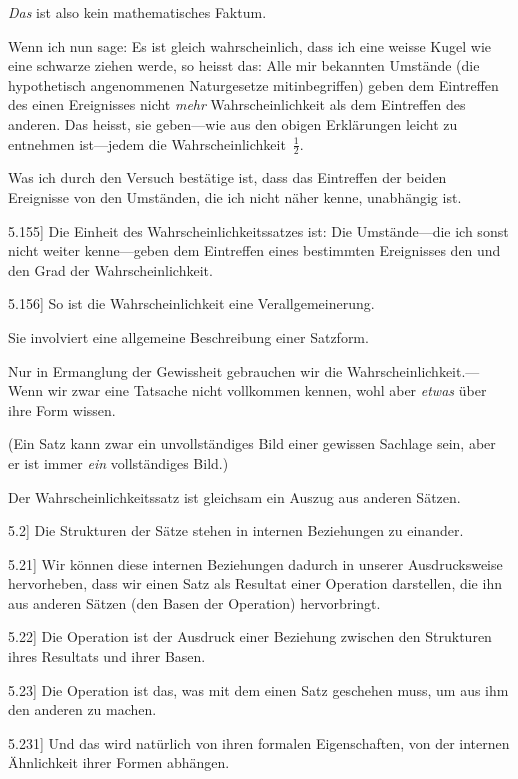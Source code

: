 \documentclass[12pt,oneside]{book}[2007/10/19]
\newcommand{\PropERef}[1]{\hyperref[PropE:#1]{#1}}
\newcommand{\PropositionG}[2]{%
  \item[\phantomsection\label{PropG:#1}\PropERef{#1}] #2%
}
\newcommand{\Emph}[1]{\emph{#1}}%
\begin{document}
\begin{propositions}
{\Emph{Das} ist also kein mathematisches Faktum.

Wenn ich nun sage: Es ist gleich wahrscheinlich,
dass ich eine weisse Kugel wie eine
schwarze ziehen werde, so heisst das: Alle mir
bekannten Umstände (die hypothetisch angenommenen
Naturgesetze mitinbegriffen) geben dem
Eintreffen des einen Ereignisses nicht \Emph{mehr}
Wahrscheinlichkeit als dem Eintreffen des anderen.
Das heisst, sie geben---wie aus den obigen Erklärungen
leicht zu entnehmen ist---jedem die
Wahrscheinlichkeit~$\frac{1}{2}$.

Was ich durch den Versuch bestätige ist, dass
das Eintreffen der beiden Ereignisse von den Umständen,
die ich nicht näher kenne, unabhängig ist.}


\PropositionG{5.155}
{Die Einheit des Wahrscheinlichkeitssatzes ist:
Die Umstände---die ich sonst nicht weiter kenne---geben
dem Eintreffen eines bestimmten Ereignisses
den und den Grad der Wahrscheinlichkeit.}


\PropositionG{5.156}
{So ist die Wahrscheinlichkeit eine Verallgemeinerung.

Sie involviert eine allgemeine Beschreibung
einer Satzform.

Nur in Ermanglung der Gewissheit gebrauchen
wir die Wahr\-schein\-lich\-keit.---Wenn wir zwar eine
Tatsache nicht vollkommen kennen, wohl aber
\Emph{etwas} über ihre Form wissen.

(Ein Satz kann zwar ein unvollständiges Bild
einer gewissen Sachlage sein, aber er ist immer
\Emph{ein} vollständiges Bild.)

Der Wahrscheinlichkeitssatz ist gleichsam ein
Auszug aus anderen Sätzen.}


\PropositionG{5.2}
{Die Strukturen der Sätze stehen in internen
Beziehungen zu einander.}


\PropositionG{5.21}
{Wir können diese internen Beziehungen
dadurch in unserer Ausdrucksweise hervorheben,
dass wir einen Satz als Resultat einer Operation
darstellen, die ihn aus anderen Sätzen (den Basen
der Operation) hervorbringt.}


\PropositionG{5.22}
{Die Operation ist der Ausdruck einer Beziehung
zwischen den Strukturen ihres Resultats und ihrer
Basen.}


\PropositionG{5.23}
{Die Operation ist das, was mit dem einen Satz
geschehen muss, um aus ihm den anderen zu machen.}


\PropositionG{5.231}
{Und das wird natürlich von ihren formalen
Eigenschaften, von der internen Ähnlichkeit ihrer
Formen abhängen.}



\end{propositions}
\end{document}
